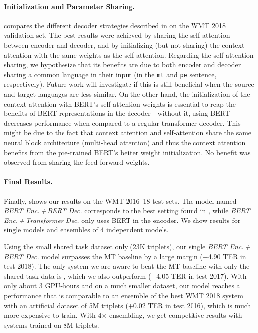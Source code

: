 \paragraph*{Initialization and Parameter Sharing.}
 compares the different decoder
strategies described in  on the WMT 2018
validation set. The best results were achieved by sharing the
self-attention between encoder and decoder, and by initializing (but
not sharing) the context attention with the same weights as the
self-attention. Regarding the self-attention sharing, we hypothesize
that its benefits are due to both encoder and decoder sharing a
common language in their input (in the {\tt mt} and {\tt pe}
sentence, respectively). Future work will investigate if this is
still beneficial when the source and target languages are less
similar. On the other hand, the initialization of the context
attention with BERT's self-attention weights is essential to reap the
benefits of BERT representations in the decoder---without it, using
BERT decreases performance when compared to a regular transformer
decoder. This might be due to the fact that context attention and
self-attention share the same neural block architecture (multi-head
attention) and thus the context attention benefits from the
pre-trained BERT's better weight initialization. No benefit was
observed from sharing the feed-forward weights.

\paragraph*{Final Results.}
Finally,  shows our results on the WMT
2016--18 test sets. The model named \emph{BERT Enc.\,+\,BERT Dec.}
corresponds to the best setting found in
, while \emph{BERT Enc.\,+\,Transformer
  Dec.} only uses BERT in the encoder. We show results for single
models and ensembles of 4 independent models.

Using the small shared task dataset only (23K triplets), our single
\emph{BERT Enc.\,+\,BERT Dec.} model surpasses the MT baseline by a
large margin ($-$4.90 TER in test 2018). The only system we are aware
to beat the MT baseline with only the shared task data is
\citet{berard2017lig}, which we also outperform ($-$4.05 TER in test
2017). With only about 3 GPU-hours and on a much smaller dataset, our
model reaches a performance that is comparable to an ensemble of the
best WMT 2018 system with an artificial dataset of 5M triplets
($+$0.02 TER in test 2016), which is much more expensive to train.
With 4$\times$ ensembling, we get competitive results with systems
trained on 8M triplets.

